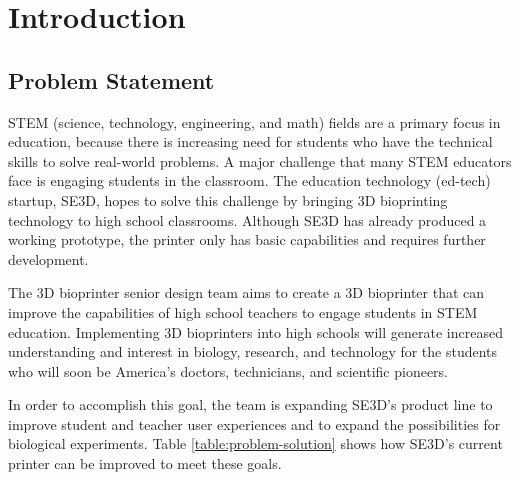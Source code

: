 \chapter{Introduction}

\section{Problem Statement}

 STEM (science, technology, engineering, and math) fields are a primary focus in education, because there is increasing need for students who have the technical skills to solve real-world problems. A major challenge that many STEM educators face is engaging students in the classroom. The education technology (ed-tech) startup, SE3D, hopes to solve this challenge by bringing 3D bioprinting technology to high school classrooms. Although SE3D has already produced a working prototype, the printer only has basic capabilities and requires further development.  

The 3D bioprinter senior design team aims to create a 3D bioprinter that can improve the capabilities of high school teachers to engage students in STEM education. Implementing 3D bioprinters into high schools will generate increased understanding and interest in biology, research, and technology for the students who will soon be America’s doctors, technicians, and scientific pioneers. 

In order to accomplish this goal, the team is expanding SE3D’s product line to improve student and teacher user experiences and to expand the possibilities for biological experiments. Table \ref{table:problem-solution} shows how SE3D’s current printer can be improved to meet these goals. 


